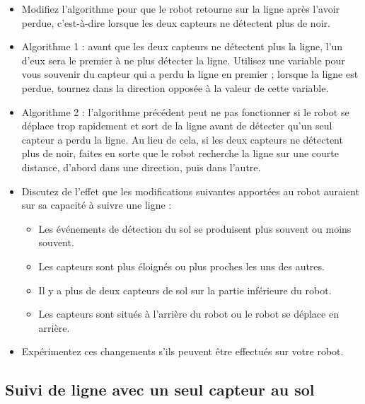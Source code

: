 \begin{framed}
\begin{itemize}
\item Modifiez l'algorithme pour que le robot retourne sur la ligne après l'avoir perdue, c'est-à-dire lorsque les deux capteurs ne détectent plus de noir.
\item Algorithme 1 : avant que les deux capteurs ne détectent plus la ligne, l'un d'eux sera le premier à ne plus détecter la ligne. Utilisez une variable pour vous souvenir du capteur qui a perdu la ligne en premier ; lorsque la ligne est perdue, tournez dans la direction opposée à la valeur de cette variable.
\item Algorithme 2 : l'algorithme précédent peut ne pas fonctionner si le robot se déplace trop rapidement et sort de la ligne avant de détecter qu'un seul capteur a perdu la ligne. Au lieu de cela, si les deux capteurs ne détectent plus de noir, faites en sorte que le robot recherche la ligne sur une courte distance, d'abord dans une direction, puis dans l'autre.
\end{itemize}
\end{framed}

\begin{framed}
\begin{itemize}
\item Discutez de l'effet que les modifications suivantes apportées au robot auraient sur sa capacité à suivre une ligne :
\begin{itemize}
\item Les événements de détection du sol se produisent plus souvent ou moins souvent.
\item Les capteurs sont plus éloignés ou plus proches les uns des autres.
\item Il y a plus de deux capteurs de sol sur la partie inférieure du robot.
\item Les capteurs sont situés à l'arrière du robot ou le robot se déplace en arrière.
\end{itemize}
\item Expérimentez ces changements s'ils peuvent être effectués sur votre robot.
\end{itemize}
\end{framed}

\subsection{Suivi de ligne avec un seul capteur au sol}

